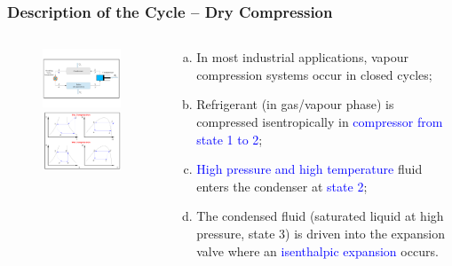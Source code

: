 \documentclass[10pt,compress,handout,ignorenonframetext]{beamer}
\begin{document}
\begin{frame}
 \frametitle{Description of the Cycle -- Dry Compression}
  \begin{columns}
   \begin{column}[c]{0.55\linewidth}
    \begin{figure}%
     \vbox{
      \includegraphics[width=5.5cm,clip]{./Pics/Overview_Refrig12}
      \vspace{-.5cm}
      \includegraphics[width=4.5cm,clip]{./Pics/Overview_Refrig13}}
    \end{figure}  
   \end{column}  
   \begin{column}[c]{0.45\linewidth}
  \begin{enumerate}[(a)] 
   \item <1-> In most industrial applications, vapour compression systems occur in closed cycles;
   \item <2-> Refrigerant (in gas/vapour phase) is compressed isentropically in \textcolor{blue}{compressor from state 1 to 2}; 
   \item <3-> \textcolor{blue}{High pressure and high temperature} fluid enters the condenser at \textcolor{blue}{state 2};
   \item <4-> The condensed fluid (saturated liquid at high pressure, state 3) is driven into the expansion valve where an \textcolor{blue}{isenthalpic expansion} occurs.
  \end{enumerate}
 \end{column}  
\end{columns}
\end{frame}
\end{document}
